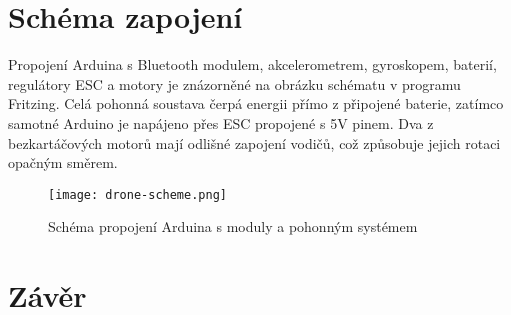 \documentclass[12pt]{report}
\begin{document}
\chapter{Schéma zapojení}
Propojení Arduina s Bluetooth modulem, akcelerometrem, gyroskopem, baterií, regulátory ESC a motory je znázorněné na obrázku schématu v programu Fritzing. Celá pohonná soustava čerpá energii přímo z připojené baterie, zatímco samotné Arduino je napájeno přes ESC propojené s 5V pinem. Dva z bezkartáčových motorů mají odlišné zapojení vodičů, což způsobuje jejich rotaci opačným směrem.

\vspace{40pt}
\begin{figure}[H]
	\centering
	\texttt{[image: drone-scheme.png]}
	\caption{Schéma propojení Arduina s moduly a pohonným systémem}
	\label{fig:drone-scheme.png}
\end{figure}

\chapter*{Závěr}
	
\lipsum[1]
	
\nocite{*}
\printbibliography					%
\printglossary[title={Zkratky}]		%
\listoffigures						%
\end{document}
